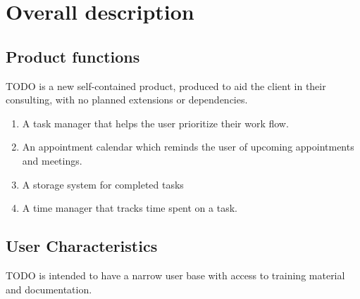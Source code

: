 \documentclass[12pt,a4paper]{article}
\begin{document}
\section{Overall description}
\subsection{Product functions}
TODO is a new self-contained product, produced to aid the client in their consulting, with no planned extensions or dependencies.
\begin{enumerate}
\item A task manager that helps the user prioritize their work flow.
\item An appointment calendar which reminds the user of upcoming appointments and meetings.
\item A storage system for completed tasks
\item A time manager that tracks time spent on a task.
\end{enumerate}
\begin{comment}

Ethan listed many things here, reconcile the list, it contradict Blakes (my) list in some ways. Ethans contribution included below\\
\begin{verbatim}
2.2.1: List must be able to store and edit the following fields of information
2.2.1.1: Task Description
2.2.1.2: Project name
2.2.1.3: Due date
2.2.1.4: Estimation of how long to complete
2.2.1.5: Later additions by the user allowed.
2.2.2: Must maintain all tasks no longer active
2.2.3: Must provide interactions
2.2.3.1: Must have "working on top TODO item" button 
2.2.3.2: Button will add time to accumulated time worked on the item until disabled
2.2.3.3: Estimated time for the item must be reduced by the accumulated time worked
2.2.4: Priority of any item must be modifiable by the client
2.2.4.1: Including setting the priority of any item to highest
2.2.4.2: Such modifications need to rearrange the TODO list.
2.2.5: Appointment are to be stored as items
2.2.5.1: Priority of appointments needs to slowly increase
2.2.5.2: Has a reminder time at which point the appointment will have highest priority
2.2.6: Must maintain a simplistic hierarchical task completion functionality
\end{verbatim}
\end{comment}

\subsection{User Characteristics}
TODO is intended to have a narrow user base with access to training material and documentation. 
\end{document}
